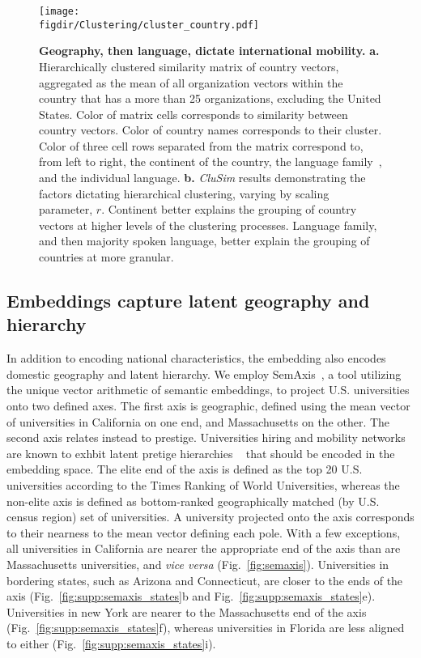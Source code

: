 \documentclass[12pt]{article} %
\def\figdir{../Figs}
\begin{document}
%
%
\begin{figure}[p!]
	\centering
	\texttt{[image: \\figdir/Clustering/cluster\_country.pdf]}
	\caption{
		\textbf{Geography, then language, dictate international mobility.}
		\textbf{a.} Hierarchically clustered similarity matrix of country vectors, aggregated as the mean of all organization vectors within the country that has a more than 25 organizations, excluding the United States. 
		Color of matrix cells corresponds to similarity between country vectors.
		Color of country names corresponds to their cluster.
		Color of three cell rows separated from the matrix correspond to, from left to right, the continent of the country, the language family~\autocite{ethnologue}, and the individual language. 
		\textbf{b.}	\textit{CluSim} \autocite{gates2019element} results demonstrating the factors dictating hierarchical clustering, varying by scaling parameter, $r$. 
		Continent better explains the grouping of country vectors at higher levels of the clustering processes.
		Language family, and then majority spoken language, better explain the grouping of countries at more granular. 
	}
	\label{fig:clustering}
\end{figure}


%
% 
\subsection*{Embeddings capture latent geography and hierarchy}

In addition to encoding national characteristics, the embedding also encodes domestic geography and latent hierarchy. 
We employ SemAxis~\autocite{an2018semaxis}, a tool utilizing the unique vector arithmetic of semantic embeddings, to project U.S. universities onto two defined axes. 
The first axis is geographic, defined using the mean vector of universities in California on one end, and Massachusetts on the other.
The second axis relates instead to prestige.
Universities hiring and mobility networks are known to exhbit latent pretige hierarchies ~\autocite{deville2014career, clauset2015hierarchy} that should be encoded in the embedding space. 
The elite end of the axis is defined as the top 20 U.S. universities according to the Times Ranking of World Universities, whereas the non-elite axis is defined as bottom-ranked geographically matched (by U.S. census region) set of universities. 
A university projected onto the axis corresponds to their nearness to the mean vector defining each pole.
With a few exceptions, all universities in California are nearer the appropriate end of the axis than are Massachusetts universities, and \textit{vice versa} (Fig.~\ref{fig:semaxis}).
Universities in bordering states, such as Arizona and Connecticut, are closer to the ends of the axis (Fig.~\ref{fig:supp:semaxis_states}b and Fig.~\ref{fig:supp:semaxis_states}e). 
Universities in new York are nearer to the Massachusetts end of the axis (Fig.~\ref{fig:supp:semaxis_states}f), whereas universities in Florida are less aligned to either (Fig.~\ref{fig:supp:semaxis_states}i). 
\end{document}
